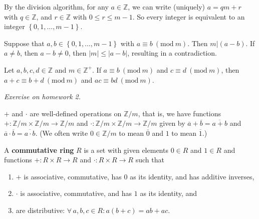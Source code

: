 \documentclass{notes}
\begin{document}
\begin{prf}
  By the division algorithm, for any $a \in \mathbb Z$, we can write (uniquely) $a = q m + r$ with $q \in \mathbb Z$, and $r \in \mathbb Z$ with $0 \leq r \leq m - 1$.
  So every integer is equivalent to an integer $\left \{ 0, 1, \dots, m - 1 \right \}$.

  Suppose that $a, b \in \left \{ 0, 1, \dots, m - 1 \right \}$ with $a \equiv b\ (\mathrm{mod}\ m)$.
  Then $m \vert (a - b)$.
  If $a \neq b$, then $a - b \neq 0$, then $\left | m \right | \leq \left | a - b \right |$, resulting in a contradiction.
\end{prf}

\begin{prop}
  Let $a, b, c, d \in \mathbb Z$ and $m \in \mathbb Z^+$.
  If $a \equiv b\ (\mathrm{mod}\ m)$ and $c \equiv d\ (\mathrm{mod}\ m)$, then $a + c \equiv b + d\ (\mathrm{mod}\ m)$ and $a c \equiv b d\ (\mathrm{mod}\ m)$.
\end{prop}

\begin{prf}
  \textit{Exercise on homework 2.}
\end{prf}

\begin{cor}
  $+$ and $\cdot$ are well-defined operations on $\mathbb Z / m$, that is, we have functions $+ \colon \mathbb Z / m \times \mathbb Z / m \to \mathbb Z / m$ and $\cdot \colon \mathbb Z / m \times \mathbb Z / m \to \mathbb Z / m$ given by $\overline a + \overline b = \overline{a + b}$ and $\overline a \cdot \overline b = \overline{a \cdot b}$.
  (We often write $0 \in \mathbb Z / m$ to mean $\overline 0$ and $1$ to mean $\overline 1$.)
\end{cor}

\begin{defn}
  A {\boldmath \bfseries commutative ring} $R$ is a set with given elements $0 \in R$ and $1 \in R$ and functions $+ \colon R \times R \to R$ and $\cdot \colon R \times R \to R$ such that 
  \begin{enumerate}
    \item $+$ is associative, commutative, has $0$ as its identity, and has additive inverses, 

    \item $\cdot$ is associative, commutative, and has $1$ as its identity, and 

    \item are distributive: $\forall \, a, b, c \in R: a (b + c) = a b + a c$.
  \end{enumerate}
\end{defn}
\end{document}

